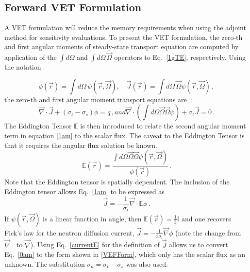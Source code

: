 \documentclass[12pt]{report}
\newcommand{\vr}{\vec{r}}
\newcommand{\vO}{\vec{\Omega}}
\renewcommand{\div}{\vec{\nabla} \cdot}
\newcommand{\grad}{\vec{\nabla}}
\newcommand{\Edd}{\mathbb{E}}
\newcommand{\sigt}{\sigma_t}
\newcommand{\sigs}{\sigma_s}
\newcommand{\siga}{\sigma_a}
\newcommand{\scalSource}{q}
\begin{document}
\subsection{Forward VET Formulation}

A VET formulation will reduce the memory requirements when using the adjoint method for sensitivity evaluations. To present the VET formulation, the zero-th and first angular moments of steady-state transport equation are computed by application of the $\int d \Omega$ and $\int d \Omega \, \vO$ operators to Eq.~\eqref{1gTE}, respectively. Using the notation

\begin{equation}
\label{VETFormStart}
\phi(\vr)=\int d\Omega \, \psi( \vr,\vO )
,\quad
\vec{J}(\vr)= \int d\Omega \, \vO \psi( \vr,\vO ) \,,
\end{equation}
the zero-th and first angular moment transport equations are~: 
%
\begin{subequations}
%
\begin{equation}
\label{0am}
\div \vec{J} + (\sigt-\sigs) \phi = \scalSource \,,
\end{equation}
and
\begin{equation}
\label{1am}
\div \left(  \int d\Omega \vO \vO \psi \right) + \sigt \vec{J} = 0 \,.
\end{equation}
%
\end{subequations}
The Eddington Tensor $\Edd$ is then introduced to relate the second angular moment term in equation \eqref{1am} to the scalar flux. The caveat to the Eddington Tensor is that it requires the angular flux solution be known.
\begin{equation}
\label{EddDef}
\Edd(\vr)=\frac{\int d\Omega \vO \vO \psi(\vr,\vO)}{\phi(\vr)} \,.
\end{equation}Note that the Eddington tensor is spatially dependent.
The inclusion of the Eddington tensor allows Eq.~\eqref{1am} to be expressed as 
\begin{equation}
\label{currentE}
\vec{J} = - \frac{1}{\sigt} \div \Edd \phi \,.
\end{equation}
If $\psi(\vr,\vO)$ is a linear function in angle, then $\Edd(\vr)=\tfrac{1}{3}\mathbb{I}$ and one recovers Fick's law for the neutron diffusion current, $\vec{J} = - \frac{1}{3\sigt} \grad \phi$ (note the change from $\div$ to $\grad$). Using Eq.~\eqref{currentE} for the definition of $\vec{J}$ allows us to convert Eq.~\eqref{0am} to the form shown in \eqref{VEFForm}, which only has the scalar flux as an unknown. The substitution $\siga = \sigt-\sigs$ was also used.
\end{document}
